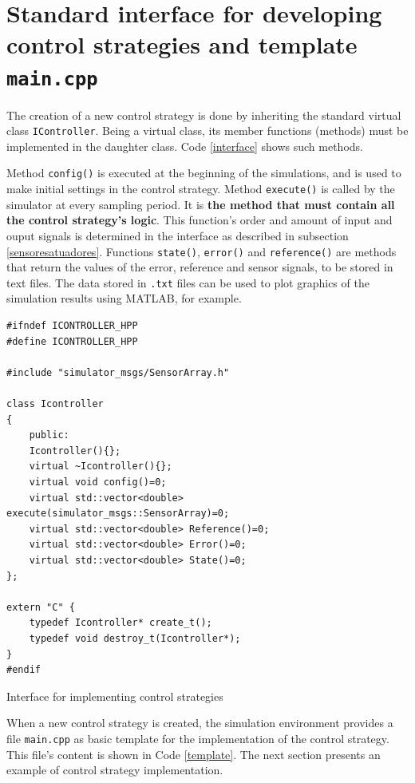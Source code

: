 \section{Standard interface for developing control strategies and template \texttt{main.cpp}}

The creation of a new control strategy is done by inheriting the standard virtual class \texttt{IController}. Being a virtual class, its member functions (methods) must be implemented in the daughter class. Code \ref{interface} shows such methods.

Method \texttt{config()} is executed at the beginning of the simulations, and is used to make initial settings in the control strategy. Method \texttt{execute()} is called by the simulator at every sampling period. It is \textbf{the method that must contain all the control strategy's logic}. This function's order and amount of input and ouput signals is determined in the interface as described in subsection \ref{sensoresatuadores}. Functions \texttt{state()}, \texttt{error()} and \texttt{reference()} are methods that return the values of the error, reference and sensor signals, to be stored in text files. The data stored in \texttt{.txt} files can be used to plot graphics of the simulation results using MATLAB, for example.

\begin{code}[H]
\begin{verbatim}
#ifndef ICONTROLLER_HPP
#define ICONTROLLER_HPP

#include "simulator_msgs/SensorArray.h"

class Icontroller 
{
	public:
	Icontroller(){};
	virtual ~Icontroller(){};
	virtual void config()=0;
	virtual std::vector<double> execute(simulator_msgs::SensorArray)=0;
	virtual std::vector<double> Reference()=0;
	virtual std::vector<double> Error()=0;
	virtual std::vector<double> State()=0;
};

extern "C" {
	typedef Icontroller* create_t();
	typedef void destroy_t(Icontroller*);
}
#endif
\end{verbatim}
\caption{Interface for implementing control strategies}
\label{interface}
\end{code}

When a new control strategy is created, the simulation environment provides a file \texttt{main.cpp} as basic template for the implementation of the control strategy. This file's content is shown in Code \ref{template}. The next section presents an example of control strategy implementation.

